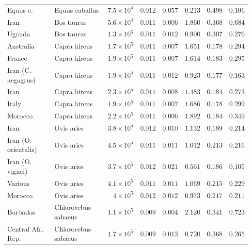 \documentclass{article}
\begin{document}
\begin{center}
\begin{longtable*}{|l|l|r|r|r|r|r|r|}
            \bottomrule
            \endlastfoot
             Equus c. & Equus caballus & $7.5\times 10^{4}$ & $ 0.012$ & $ 0.057$ & $ 0.213$ & $ 0.498$ & $ 0.106$ \\
            Iran & Bos taurus & $5.6\times 10^{4}$ & $ 0.011$ & $ 0.006$ & $ 1.860$ & $ 0.368$ & $ 0.684$ \\
            Uganda & Bos taurus & $1.3\times 10^{5}$ & $ 0.011$ & $ 0.012$ & $ 0.900$ & $ 0.307$ & $ 0.276$ \\
             Australia & Capra hircus & $1.7\times 10^{5}$ & $ 0.011$ & $ 0.007$ & $ 1.651$ & $ 0.178$ & $ 0.294$ \\
             France & Capra hircus & $1.9\times 10^{5}$ & $ 0.011$ & $ 0.007$ & $ 1.614$ & $ 0.183$ & $ 0.295$ \\
             Iran (C. aegagrus) & Capra hircus & $1.9\times 10^{5}$ & $ 0.011$ & $ 0.012$ & $ 0.923$ & $ 0.177$ & $ 0.163$ \\
             Iran & Capra hircus & $2.3\times 10^{5}$ & $ 0.011$ & $ 0.008$ & $ 1.483$ & $ 0.184$ & $ 0.273$ \\
             Italy & Capra hircus & $1.9\times 10^{5}$ & $ 0.011$ & $ 0.007$ & $ 1.686$ & $ 0.178$ & $ 0.299$ \\
             Morocco & Capra hircus & $2.2\times 10^{5}$ & $ 0.011$ & $ 0.006$ & $ 1.892$ & $ 0.184$ & $ 0.349$ \\
            Iran & Ovis aries & $3.8\times 10^{5}$ & $ 0.012$ & $ 0.010$ & $ 1.132$ & $ 0.189$ & $ 0.214$ \\
            Iran (O. orientalis) & Ovis aries & $4.5\times 10^{5}$ & $ 0.011$ & $ 0.011$ & $ 1.012$ & $ 0.213$ & $ 0.216$ \\
            Iran (O. vignei) & Ovis aries & $3.7\times 10^{5}$ & $ 0.012$ & $ 0.021$ & $ 0.561$ & $ 0.186$ & $ 0.105$ \\
            Various & Ovis aries & $4.1\times 10^{5}$ & $ 0.011$ & $ 0.011$ & $ 1.069$ & $ 0.215$ & $ 0.229$ \\
            Morocco & Ovis aries & $ 4\times 10^{5}$ & $ 0.012$ & $ 0.012$ & $ 0.973$ & $ 0.217$ & $ 0.211$ \\
             Barbados & Chlorocebus sabaeus & $1.1\times 10^{5}$ & $ 0.009$ & $ 0.004$ & $ 2.120$ & $ 0.341$ & $ 0.723$ \\
             Central Afr. Rep. & Chlorocebus sabaeus & $1.7\times 10^{5}$ & $ 0.009$ & $ 0.013$ & $ 0.720$ & $ 0.368$ & $ 0.265$ \\

\end{longtable*}
\end{center}
\end{document}
